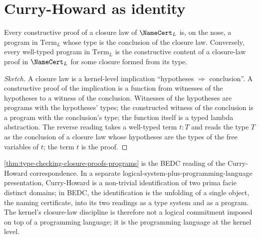 \section{Curry-Howard as identity}
\label{sec:type-checking-curry-howard}

\begin{theorem}
\label{thm:type-checking-closure-proofs-programs}
Every constructive proof of a closure law of $\NameCert_L$ is, on the nose, a program in $\mathrm{Term}_L$ whose type is the conclusion of the closure law. Conversely, every well-typed program in $\mathrm{Term}_L$ is the constructive content of a closure-law proof in $\NameCert_L$ for some closure formed from its type.
\end{theorem}

\begin{proof}[Sketch]
A closure law is a kernel-level implication ``hypotheses $\Rightarrow$ conclusion''. A constructive proof of the implication is a function from witnesses of the hypotheses to a witness of the conclusion. Witnesses of the hypotheses are programs with the hypotheses' types; the constructed witness of the conclusion is a program with the conclusion's type; the function itself is a typed lambda abstraction. The reverse reading takes a well-typed term $t \colon T$ and reads the type $T$ as the conclusion of a closure law whose hypotheses are the types of the free variables of $t$; the term $t$ is the proof.
\end{proof}

\begin{remark}
\label{rem:type-checking-curry-howard-built-in}
\autoref{thm:type-checking-closure-proofs-programs} is the BEDC reading of the Curry-Howard correspondence. In a separate logical-system-plus-programming-language presentation, Curry-Howard is a non-trivial identification of two prima facie distinct domains; in BEDC, the identification is the unfolding of a single object, the naming certificate, into its two readings as a type system and as a program. The kernel's closure-law discipline is therefore not a logical commitment imposed on top of a programming language; it is the programming language at the kernel level.
\end{remark}

